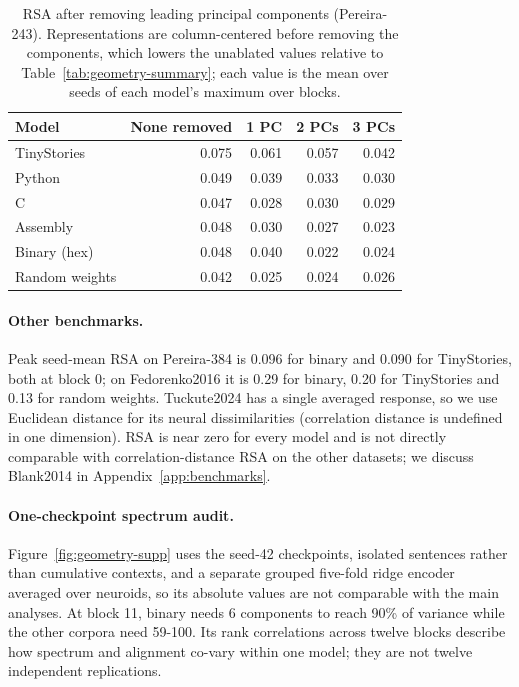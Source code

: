 \documentclass[mlmain]{jmlr}
\begin{document}
\begin{table}[htbp]
  \centering
  \caption{RSA after removing leading principal components (Pereira-243). Representations are column-centered before removing the components, which lowers the unablated values relative to Table~\ref{tab:geometry-summary}; each value is the mean over seeds of each model's maximum over blocks.}
  \label{tab:pc-ablation}
  \small
  \begin{tabular}{lrrrr}
\toprule
Model & None removed & 1 PC & 2 PCs & 3 PCs \\
\midrule
TinyStories & 0.075 & 0.061 & 0.057 & 0.042 \\
Python & 0.049 & 0.039 & 0.033 & 0.030 \\
C & 0.047 & 0.028 & 0.030 & 0.029 \\
Assembly & 0.048 & 0.030 & 0.027 & 0.023 \\
Binary (hex) & 0.048 & 0.040 & 0.022 & 0.024 \\
Random weights & 0.042 & 0.025 & 0.024 & 0.026 \\
\bottomrule
\end{tabular}
\end{table}

\paragraph{Other benchmarks.} Peak seed-mean RSA on Pereira-384 is 0.096 for binary and 0.090 for TinyStories, both at block 0; on Fedorenko2016 it is 0.29 for binary, 0.20 for TinyStories and 0.13 for random weights. Tuckute2024 has a single averaged response, so we use Euclidean distance for its neural dissimilarities (correlation distance is undefined in one dimension). RSA is near zero for every model and is not directly comparable with correlation-distance RSA on the other datasets; we discuss Blank2014 in Appendix~\ref{app:benchmarks}.

\paragraph{One-checkpoint spectrum audit.} Figure~\ref{fig:geometry-supp} uses the seed-42 checkpoints, isolated sentences rather than cumulative contexts, and a separate grouped five-fold ridge encoder averaged over neuroids, so its absolute values are not comparable with the main analyses. At block 11, binary needs 6 components to reach 90\% of variance while the other corpora need 59-100. Its rank correlations across twelve blocks describe how spectrum and alignment co-vary within one model; they are not twelve independent replications.
\end{document}
